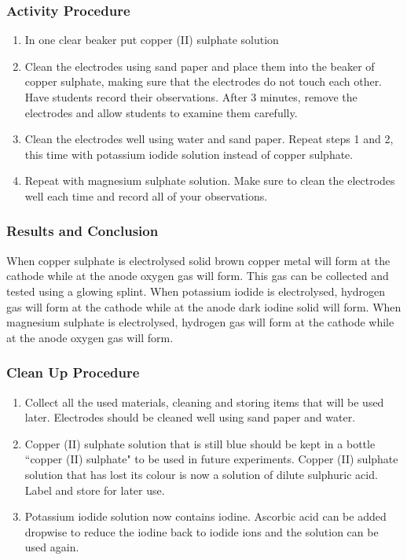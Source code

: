 \subsubsection*{Activity Procedure}
\begin{enumerate}
\item{In one clear beaker put copper (II) sulphate solution}
\item{Clean the electrodes using sand paper and place them into the beaker of copper sulphate, making sure that the electrodes do not touch each other.  Have students record their observations. After 3 minutes, remove the electrodes and allow students to examine them carefully.}
\item{Clean the electrodes well using water and sand paper. Repeat steps 1 and 2, this time with potassium iodide solution instead of copper sulphate.}
\item{Repeat with magnesium sulphate solution. Make sure to clean the electrodes well each time and record all of your observations.}
\end{enumerate}

\subsubsection*{Results and Conclusion}
When copper sulphate is electrolysed solid brown copper metal will form at the cathode while at the anode oxygen gas will form. This gas can be collected and tested using a glowing splint.
When potassium iodide is electrolysed, hydrogen gas will form at the cathode while at the anode dark iodine solid will form.
When magnesium sulphate is electrolysed, hydrogen gas will form at the cathode while at the anode oxygen gas will form.

\subsubsection*{Clean Up Procedure}
\begin{enumerate}
\item{Collect all the used materials, cleaning and storing items that will be used later. Electrodes should be cleaned well using sand paper and water.}
\item{Copper (II) sulphate solution that is still blue should be kept in a bottle ``copper (II) sulphate" to be used in future experiments. Copper (II) sulphate solution that has lost its colour is now a solution of dilute sulphuric acid. Label and store for later use.}
\item{Potassium iodide solution now contains iodine. Ascorbic acid can be added dropwise to reduce the iodine back to iodide ions and the solution can be used again.}
\end{enumerate}

